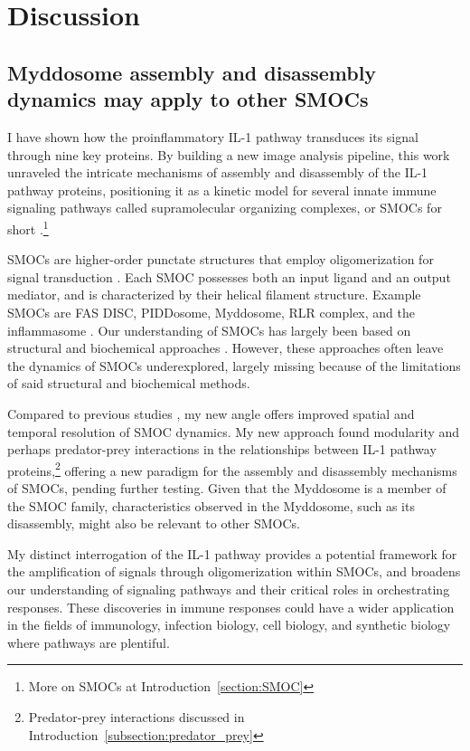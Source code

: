\chapter{Discussion}
\section{Myddosome assembly and disassembly dynamics may apply to other SMOCs}
I have shown how the proinflammatory IL-1 pathway transduces its signal through nine key proteins. By building a new image analysis pipeline, this work unraveled the intricate mechanisms of assembly and disassembly of the IL-1 pathway proteins, positioning it as a kinetic model for several innate immune signaling pathways called supramolecular organizing complexes, or SMOCs for short \autocite{Kagan_2014}.\footnote{More on SMOCs at Introduction~\ref{section:SMOC}}

SMOCs are higher-order punctate structures that employ oligomerization for signal transduction \autocite{Kagan_2014}. Each SMOC possesses both an input ligand and an output mediator, and is characterized by their helical filament structure. Example SMOCs are FAS DISC, PIDDosome, Myddosome, RLR complex, and the inflammasome \autocite{Kagan_2014}. Our understanding of SMOCs has largely been based on structural and biochemical approaches \autocite{Balka_2019}\autocite{Kagan_2014}. However, these approaches often leave the dynamics of SMOCs underexplored, largely missing because of the limitations of said structural and biochemical methods.

Compared to previous studies \autocite{Latty_2018}\autocite{Moncrieffe_2020}, my new angle offers improved spatial and temporal resolution of SMOC dynamics. My new approach found modularity and perhaps predator-prey interactions in the relationships between IL-1 pathway proteins,\footnote{Predator-prey interactions discussed in Introduction~\ref{subsection:predator_prey}} offering a new paradigm for the assembly and disassembly mechanisms of SMOCs, pending further testing. Given that the Myddosome is a member of the SMOC family, characteristics observed in the Myddosome, such as its disassembly, might also be relevant to other SMOCs.

My distinct interrogation of the IL-1 pathway provides a potential framework for the amplification of signals through oligomerization within SMOCs, and broadens our understanding of signaling pathways and their critical roles in orchestrating responses. These discoveries in immune responses could have a wider application in the fields of immunology, infection biology, cell biology, and synthetic biology where pathways are plentiful.


